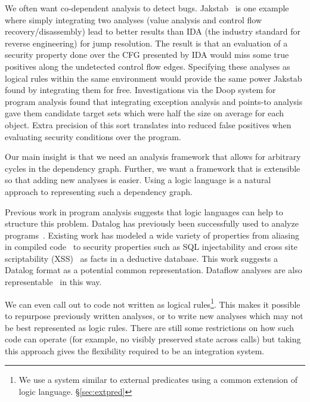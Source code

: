We often want co-dependent analysis to detect bugs.
Jakstab~\cite{jakstab} is one example where simply integrating two analyses (value analysis and control flow recovery/disassembly) lead to better results than IDA\cite{ida} (the industry standard for reverse engineering) for jump resolution.
The result is that an evaluation of a security property done over the CFG presented by IDA would miss some true positives along the undetected control flow edges.
Specifying these analyses as logical rules within the same environment would provide the same power Jakstab found by integrating them for free.
Investigations via the Doop\cite{doop1} system for program analysis found that integrating exception analysis and points-to analysis gave them candidate target sets which were half the size on average for each object.
Extra precision of this sort translates into reduced false positives when evaluating security conditions over the program.

Our main insight is that we need an analysis framework that allows for arbitrary cycles in the dependency graph.
Further, we want a framework that is extensible so that adding new analyses is easier.
Using a logic language is a natural approach to representing such a dependency graph.

Previous work in program analysis suggests that logic languages can help to structure this problem.
Datalog has previously been successfully used to analyze programs~\cite{lam2005,brumley2006,alpuente2011,doop1,bddbddb}.
Existing work has modeled a wide variety of properties from aliasing in compiled code~\cite{brumley2006} to security properties such as SQL injectability and cross site scriptability (XSS)~\cite{lam2005} as facts in a deductive database.
This work suggests a Datalog format as a potential common representation.
Dataflow analyses are also representable~\cite{mcallester2002} in this way.

We can even call out to code not written as logical rules\footnote{We use a system similar to external predicates using a common extension of logic language. \S\ref{sec:extpred}}.
This makes it possible to repurpose previously written analyses, or to write new analyses which may not be best represented as logic rules.
There are still some restrictions on how such code can operate (for example, no visibly preserved state across calls) but taking this approach gives the flexibility required to be an integration system.

